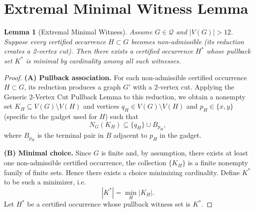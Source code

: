 \documentclass[12pt]{article}
\newtheorem{lemma}[theorem]{Lemma}
\begin{document}
\section*{Extremal Minimal Witness Lemma}

\begin{lemma}[Extremal Minimal Witness]
Assume $G \in \mathcal{Q}$ and $|V(G)| > 12$.
Suppose every certified occurrence $H \subset G$ becomes non-admissible (its reduction creates a 2-vertex cut).
Then there exists a certified occurrence $H^*$ whose pullback set $K^*$ is minimal by cardinality among all such witnesses.
\end{lemma}

\begin{proof}
\textbf{(A) Pullback association.}
For each non-admissible certified occurrence $H \subset G$, its reduction produces a graph $G'$ with a 2-vertex cut.
Applying the Generic 2-Vertex Cut Pullback Lemma to this reduction, we obtain a nonempty set
$K_H \subseteq V(G)\setminus V(H)$ and vertices $q_H \in V(G)\setminus V(H)$ and $p_H \in \{x,y\}$
(specific to the gadget used for $H$) such that
\[
N_G(K_H) \subseteq \{q_H\} \cup B_{p_H},
\]
where $B_{p_H}$ is the terminal pair in $B$ adjacent to $p_H$ in the gadget.

\medskip
\textbf{(B) Minimal choice.}
Since $G$ is finite and, by assumption, there exists at least one non-admissible certified occurrence,
the collection $\{K_H\}$ is a finite nonempty family of finite sets.
Hence there exists a choice minimizing cardinality.
Define $K^*$ to be such a minimizer, i.e.
\[
|K^*| = \min_H |K_H|.
\]
Let $H^*$ be a certified occurrence whose pullback witness set is $K^*$.
\end{proof}
\end{document}
